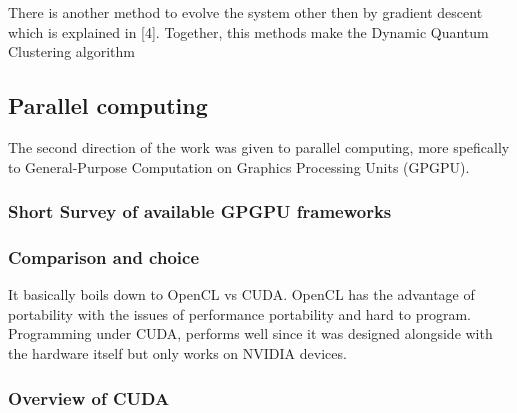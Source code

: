 There is another method to evolve the system other then by gradient descent which is explained in [4]. Together, this methods make the Dynamic Quantum Clustering algorithm %



%
%
%
%


\subsection{Parallel computing}
The second direction of the work was given to parallel computing, more spefically to General-Purpose Computation on Graphics Processing Units (GPGPU). 

\subsubsection{Short Survey of available GPGPU frameworks}


\subsubsection{Comparison and choice}
It basically boils down to OpenCL vs CUDA. OpenCL has the advantage of portability with the issues of performance portability and hard to program. Programming under CUDA, performs well since it was designed alongside with the hardware itself but only works on NVIDIA devices.

\subsubsection{Overview of CUDA}

